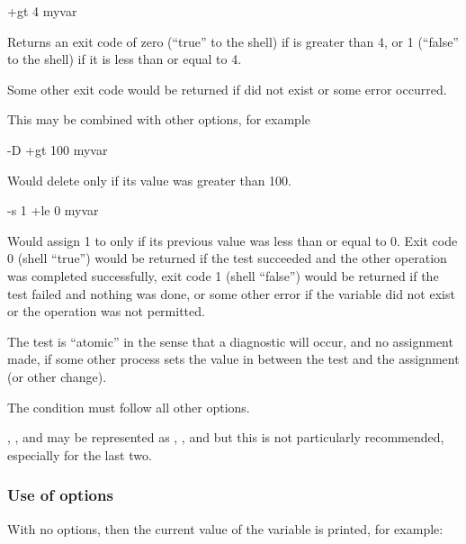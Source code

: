 \begin{expara}

\BtvarName{} +gt 4 myvar

\end{expara}

Returns an exit code of zero (``true'' to the shell) if  is greater than 4, or 1 (``false'' to the shell) if it is less than
or equal to 4.

Some other exit code would be returned if  did not exist or some error occurred.

This may be combined with other options, for example

\begin{expara}

\BtvarName{} -D +gt 100 myvar

\end{expara}

Would delete  only if its value was greater than 100.

\begin{expara}

\BtvarName{} -s 1 +le 0 myvar

\end{expara}

Would assign 1 to  only if its previous value was less than or equal to 0. Exit code 0 (shell
``true'') would be returned if the test succeeded and the other operation was completed successfully, exit code
1 (shell ``false'') would be returned if the test failed and nothing was done, or some other error if the variable
did not exist or the operation was not permitted.

The test is ``atomic'' in the sense that a diagnostic will occur, and no assignment made, if some other process
sets the value in between the test and the assignment (or other change).

The condition must follow all other options.

, ,  and  may be represented as ,
,  and  but this is not particularly recommended, especially for the last two.

\subsubsection{Use of options}
With no options, then the current value of the variable is printed, for example:

